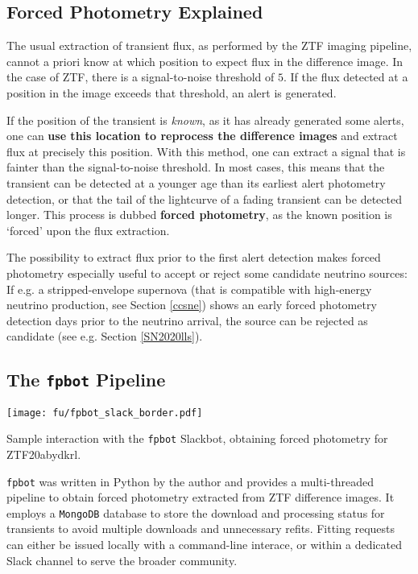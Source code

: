 \subsection{Forced Photometry Explained}
The usual extraction of transient flux, as performed by the ZTF imaging pipeline, cannot a priori know at which position to expect flux in the difference image. In the case of ZTF, there is a signal-to-noise threshold of $5$. If the flux detected at a position in the image exceeds that threshold, an alert is generated.

If the position of the transient is \textit{known}, as it has already generated some alerts, one can \textbf{use this location to reprocess the difference images} and extract flux at precisely this position. With this method, one can extract a signal that is fainter than the signal-to-noise threshold. In most cases, this means that the transient can be detected at a younger age than its earliest alert photometry detection, or that the tail of the lightcurve of a fading transient can be detected longer. This process is dubbed \textbf{forced photometry}, as the known position is `forced' upon the flux extraction.

The possibility to extract flux prior to the first alert detection makes forced photometry especially useful to accept or reject some candidate neutrino sources: If e.g. a stripped-envelope supernova (that is compatible with high-energy neutrino production, see Section \ref{ccsne}) shows an early forced photometry detection days prior to the neutrino arrival, the source can be rejected as candidate (see e.g. Section \ref{SN2020lls}).

\subsection{The \texttt{fpbot} Pipeline}
\begin{marginfigure}
    \texttt{[image: fu/fpbot\_slack\_border.pdf]}
    \caption[\texttt{fpbot} Slackbot interaction]{Sample interaction with the \texttt{fpbot} Slackbot, obtaining forced photometry for ZTF20abydkrl.}
\end{marginfigure} 
\texttt{fpbot} was written in Python by the author and provides a multi-threaded pipeline to obtain forced photometry extracted from ZTF difference images. It employs a \texttt{MongoDB} database to store the download and processing status for transients to avoid multiple downloads and unnecessary refits. Fitting requests can either be issued locally with a command-line interace, or within a dedicated Slack channel to serve the broader community.

